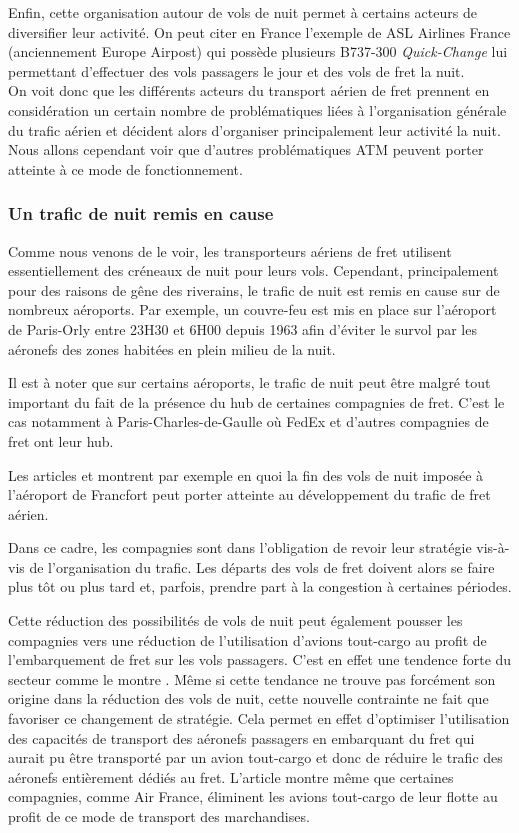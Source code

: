 Enfin, cette organisation autour de vols de nuit permet à certains acteurs de diversifier leur activité. On peut citer en France l'exemple de ASL Airlines France (anciennement Europe Airpost) qui possède plusieurs B737-300 \textit{Quick-Change} lui permettant d'effectuer des vols passagers le jour et des vols de fret la nuit.\\

On voit donc que les différents acteurs du transport aérien de fret prennent en considération un certain nombre de problématiques liées à l'organisation générale du trafic aérien et décident alors d'organiser principalement leur activité la nuit. Nous allons cependant voir que d'autres problématiques ATM peuvent porter atteinte à ce mode de fonctionnement.

\subsubsection{Un trafic de nuit remis en cause}

Comme nous venons de le voir, les transporteurs aériens de fret utilisent essentiellement des créneaux de nuit pour leurs vols. Cependant, principalement pour des raisons de gêne des riverains, le trafic de nuit est remis en cause sur de nombreux aéroports. Par exemple, un couvre-feu est mis en place sur l'aéroport de Paris-Orly entre 23H30 et 6H00 depuis 1963 afin d'éviter le survol par les aéronefs des zones habitées en plein milieu de la nuit.

Il est à noter que sur certains aéroports, le trafic de nuit peut être malgré tout important du fait de la présence du hub de certaines compagnies de fret. C'est le cas notamment à Paris-Charles-de-Gaulle où FedEx et d'autres compagnies de fret ont leur hub. 

Les articles \cite{boutelet_2012} et \cite{garric_2012} montrent par exemple en quoi la fin des vols de nuit imposée à l'aéroport de Francfort peut porter atteinte au développement du trafic de fret aérien.

Dans ce cadre, les compagnies sont dans l'obligation de revoir leur stratégie vis-à-vis de l'organisation du trafic. Les départs des vols de fret doivent alors se faire plus tôt ou plus tard et, parfois, prendre part à la congestion à certaines périodes.

Cette réduction des possibilités de vols de nuit peut également pousser les compagnies vers une réduction de l'utilisation d'avions tout-cargo au profit de l'embarquement de fret sur les vols passagers. C'est en effet une tendence forte du secteur comme le montre \cite{RePEc:eee:jaitra:v:61:y:2017:i:c:p:34-40}. Même si cette tendance ne trouve pas forcément son origine dans la réduction des vols de nuit, cette nouvelle contrainte ne fait que favoriser ce changement de stratégie. Cela permet en effet d'optimiser l'utilisation des capacités de transport des aéronefs passagers en embarquant du fret qui aurait pu être transporté par un avion tout-cargo et donc de réduire le trafic des aéronefs entièrement dédiés au fret. L'article montre même que certaines compagnies, comme Air France, éliminent les avions tout-cargo de leur flotte au profit de ce mode de transport des marchandises.

